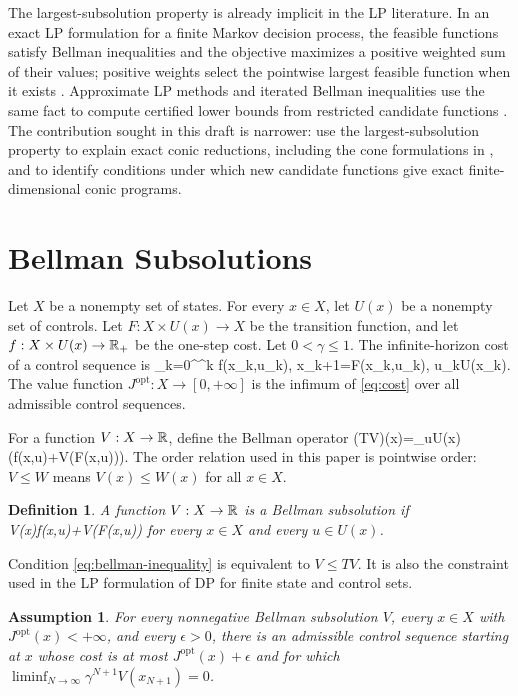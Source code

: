 \documentclass{article}
\newtheorem{assumption}{Assumption}
\newtheorem{definition}{Definition}
\begin{document}
The largest-subsolution property is already implicit in the LP literature. In an exact LP formulation for a finite Markov decision process, the feasible functions satisfy Bellman inequalities and the objective maximizes a positive weighted sum of their values; positive weights select the pointwise largest feasible function when it exists \cite{manne-1960,bertsekas-2007}. Approximate LP methods and iterated Bellman inequalities use the same fact to compute certified lower bounds from restricted candidate functions \cite{de-farias-van-roy-2003,wang-odonoghue-boyd-2015}. The contribution sought in this draft is narrower: use the largest-subsolution property to explain exact conic reductions, including the cone formulations in \cite{pates-rantzer-cdc}, and to identify conditions under which new candidate functions give exact finite-dimensional conic programs.

\section{Bellman Subsolutions}

Let $X$ be a nonempty set of states. For every $x\in X$, let $U(x)$ be a nonempty set of controls. Let $F:X\times U(x)\rightarrow X$ be the transition function, and let $f:X\times U(x)\rightarrow\mathbb{R}_+$ be the one-step cost. Let $0<\gamma\leq 1$. The infinite-horizon cost of a control sequence is
\BEQ
\sum_{k=0}^{\infty}\gamma^k f(x_k,u_k),
\quad x_{k+1}=F(x_k,u_k),
\quad u_k\in U(x_k).
\label{eq:cost}
\EEQ
The value function $J^\textrm{opt}:X\rightarrow[0,+\infty]$ is the infimum of \eqref{eq:cost} over all admissible control sequences.

For a function $V:X\rightarrow\mathbb{R}$, define the Bellman operator
\BEQ
(TV)(x)=\inf_{u\in U(x)}\left(f(x,u)+\gamma V(F(x,u))\right).
\label{eq:bellman-operator}
\EEQ
The order relation used in this paper is pointwise order: $V\leq W$ means $V(x)\leq W(x)$ for all $x\in X$.

\begin{definition}
A function $V:X\rightarrow\mathbb{R}$ is a Bellman subsolution if
\BEQ
V(x)\leq f(x,u)+\gamma V(F(x,u))
\label{eq:bellman-inequality}
\EEQ
for every $x\in X$ and every $u\in U(x)$.
\end{definition}

Condition \eqref{eq:bellman-inequality} is equivalent to $V\leq TV$. It is also the constraint used in the LP formulation of DP for finite state and control sets.

\begin{assumption}
\label{ass:proper-policy}
For every nonnegative Bellman subsolution $V$, every $x\in X$ with $J^\textrm{opt}(x)<+\infty$, and every $\epsilon>0$, there is an admissible control sequence starting at $x$ whose cost is at most $J^\textrm{opt}(x)+\epsilon$ and for which $\liminf_{N\to\infty}\gamma^{N+1}V(x_{N+1})=0$.
\end{assumption}
\end{document}
